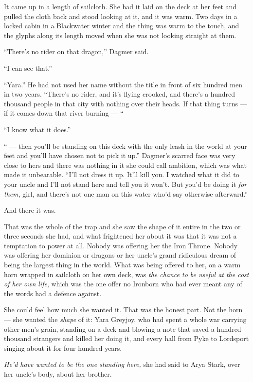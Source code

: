 It came up in a length of sailcloth. She had it laid on the deck at her feet and pulled the cloth back and stood looking at it, and it was warm. Two days in a locked cabin in a Blackwater winter and the thing was warm to the touch, and the glyphs along its length moved when she was not looking straight at them.

“There’s no rider on that dragon,” Dagmer said.

“I can see that.”

“Yara.” He had not used her name without the title in front of six hundred men in two years. “There’s no rider, and it’s flying crooked, and there’s a hundred thousand people in that city with nothing over their heads. If that thing turns — if it comes down that river burning — “

“I know what it does.”

“ — then you’ll be standing on this deck with the only leash in the world at your feet and you’ll have chosen not to pick it up.” Dagmer’s scarred face was very close to hers and there was nothing in it she could call ambition, which was what made it unbearable. “I’ll not dress it up. It’ll kill you. I watched what it did to your uncle and I’ll not stand here and tell you it won’t. But you’d be doing it \textit{for them}, girl, and there’s not one man on this water who’d say otherwise afterward.”

And there it was.

That was the whole of the trap and she saw the shape of it entire in the two or three seconds she had, and what frightened her about it was that it was not a temptation to power at all. Nobody was offering her the Iron Throne. Nobody was offering her dominion or dragons or her uncle’s grand ridiculous dream of being the largest thing in the world. What was being offered to her, on a warm horn wrapped in sailcloth on her own deck, was \textit{the chance to be useful at the cost of her own life}, which was the one offer no Ironborn who had ever meant any of the words had a defence against.

She could feel how much she wanted it. That was the honest part. Not the horn — she wanted the \textit{shape} of it: Yara Greyjoy, who had spent a whole war carrying other men’s grain, standing on a deck and blowing a note that saved a hundred thousand strangers and killed her doing it, and every hall from Pyke to Lordsport singing about it for four hundred years.

\textit{He’d have wanted to be the one standing here,} she had said to Arya Stark, over her uncle’s body, about her brother.

